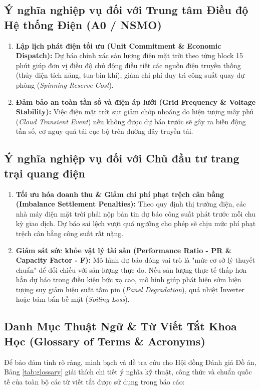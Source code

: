 \documentclass[12pt,a4paper]{article}
\begin{document}
\subsection{Ý nghĩa nghiệp vụ đối với Trung tâm Điều độ Hệ thống Điện (A0 / NSMO)}
\begin{enumerate}
    \item \textbf{Lập lịch phát điện tối ưu (Unit Commitment \& Economic Dispatch):} Dự báo chính xác sản lượng điện mặt trời theo từng block 15 phút giúp đơn vị điều độ chủ động điều tiết các nguồn điện truyền thống (thủy điện tích năng, tua-bin khí), giảm chi phí duy trì công suất quay dự phòng (\textit{Spinning Reserve Cost}).
    \item \textbf{Đảm bảo an toàn tần số và điện áp lưới (Grid Frequency \& Voltage Stability):} Việc điện mặt trời sụt giảm chớp nhoáng do hiện tượng mây phủ (\textit{Cloud Transient Event}) nếu không được dự báo trước sẽ gây ra biến động tần số, cơ nguy quá tải cục bộ trên đường dây truyền tải.
\end{enumerate}

\subsection{Ý nghĩa nghiệp vụ đối với Chủ đầu tư trang trại quang điện}
\begin{enumerate}
    \item \textbf{Tối ưu hóa doanh thu \& Giảm chi phí phạt trệch cân bằng (Imbalance Settlement Penalties):} Theo quy định thị trường điện, các nhà máy điện mặt trời phải nộp bản tin dự báo công suất phát trước mỗi chu kỳ giao dịch. Dự báo sai lệch vượt quá ngưỡng cho phép sẽ chịu mức phí phạt trệch cân bằng công suất rất nặng.
    \item \textbf{Giám sát sức khỏe vật lý tài sản (Performance Ratio - PR \& Capacity Factor - F):} Mô hình dự báo đóng vai trò là "mức cơ sở lý thuyết chuẩn" để đối chiếu với sản lượng thực đo. Nếu sản lượng thực tế thấp hơn hẳn dự báo trong điều kiện bức xạ cao, mô hình giúp phát hiện sớm hiện tượng suy giảm hiệu suất tấm pin (\textit{Panel Degradation}), quá nhiệt Inverter hoặc bám bẩn bề mặt (\textit{Soiling Loss}).
\end{enumerate}


\subsection{Danh Mục Thuật Ngữ \& Từ Viết Tắt Khoa Học (Glossary of Terms \& Acronyms)}
Để bảo đảm tính rõ ràng, minh bạch và dễ tra cứu cho Hội đồng Đánh giá Đồ án, Bảng \ref{tab:glossary} giải thích chi tiết ý nghĩa kỹ thuật, công thức và chuẩn quốc tế của toàn bộ các từ viết tắt được sử dụng trong báo cáo:
\end{document}
